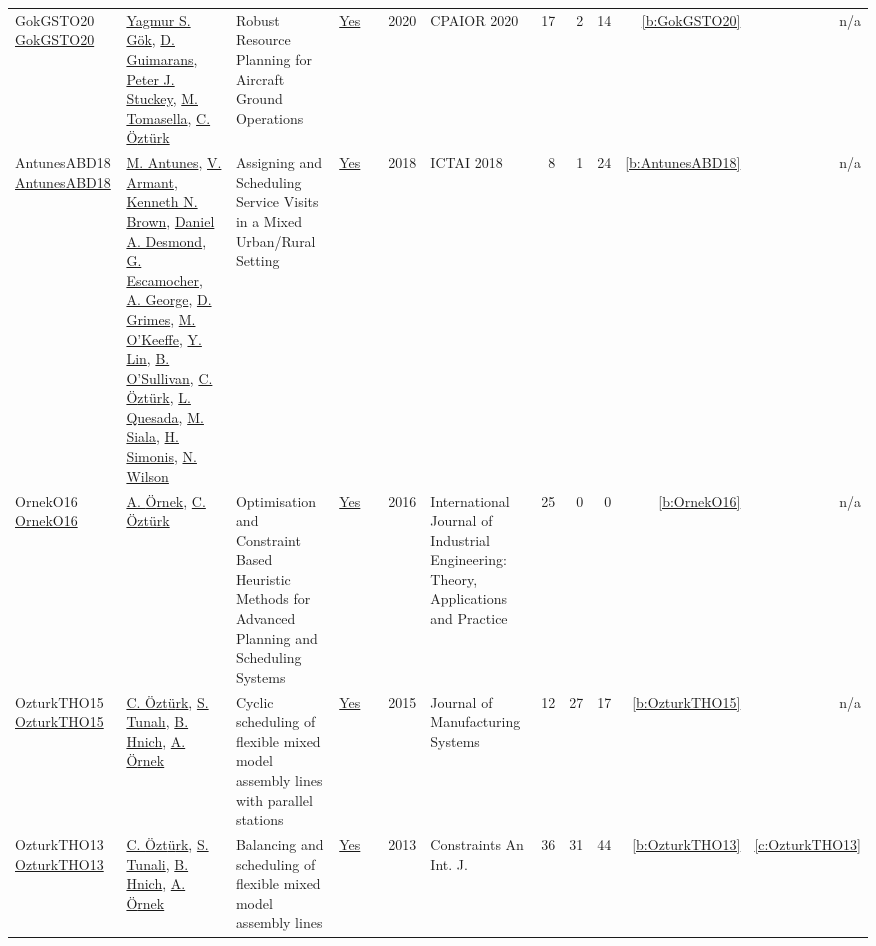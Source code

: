 {\begin{longtable}{>{\raggedright\arraybackslash}p{3cm}>{\raggedright\arraybackslash}p{6cm}>{\raggedright\arraybackslash}p{6.5cm}rrrp{2.5cm}rrrrr}
GokGSTO20 \href{https://doi.org/10.1007/978-3-030-58942-4_15}{GokGSTO20} & \hyperref[auth:a1027]{Yagmur S. G\"{o}k}, \hyperref[auth:a1025]{D. Guimarans}, \hyperref[auth:a126]{Peter J. Stuckey}, \hyperref[auth:a1024]{M. Tomasella}, \hyperref[auth:a136]{C. {\"{O}}zt{\"{u}}rk} & Robust Resource Planning for Aircraft Ground Operations & \href{../works/GokGSTO20.pdf}{Yes} & \cite{GokGSTO20} & 2020 & CPAIOR 2020 & 17 & 2 & 14 & \ref{b:GokGSTO20} & n/a\\
AntunesABD18 \href{https://doi.org/10.1109/ICTAI.2018.00027}{AntunesABD18} & \hyperref[auth:a884]{M. Antunes}, \hyperref[auth:a885]{V. Armant}, \hyperref[auth:a222]{Kenneth N. Brown}, \hyperref[auth:a886]{Daniel A. Desmond}, \hyperref[auth:a887]{G. Escamocher}, \hyperref[auth:a888]{A. George}, \hyperref[auth:a182]{D. Grimes}, \hyperref[auth:a889]{M. O'Keeffe}, \hyperref[auth:a890]{Y. Lin}, \hyperref[auth:a16]{B. O'Sullivan}, \hyperref[auth:a136]{C. {\"{O}}zt{\"{u}}rk}, \hyperref[auth:a891]{L. Quesada}, \hyperref[auth:a130]{M. Siala}, \hyperref[auth:a17]{H. Simonis}, \hyperref[auth:a832]{N. Wilson} & Assigning and Scheduling Service Visits in a Mixed Urban/Rural Setting & \href{../works/AntunesABD18.pdf}{Yes} & \cite{AntunesABD18} & 2018 & ICTAI 2018 & 8 & 1 & 24 & \ref{b:AntunesABD18} & n/a\\
OrnekO16 \href{https://journals.sfu.ca/ijietap/index.php/ijie/article/view/1930}{OrnekO16} & \hyperref[auth:a139]{A. {\"{O}}rnek}, \hyperref[auth:a136]{C. {\"{O}}zt{\"{u}}rk} & Optimisation and Constraint Based Heuristic Methods for Advanced Planning and Scheduling Systems & \href{../works/OrnekO16.pdf}{Yes} & \cite{OrnekO16} & 2016 & International Journal of Industrial Engineering: Theory, Applications and Practice & 25 & 0 & 0 & \ref{b:OrnekO16} & n/a\\
OzturkTHO15 \href{https://www.sciencedirect.com/science/article/pii/S0278612515000527}{OzturkTHO15} & \hyperref[auth:a136]{C. {\"{O}}zt{\"{u}}rk}, \hyperref[auth:a1029]{S. Tunalı}, \hyperref[auth:a138]{B. Hnich}, \hyperref[auth:a139]{A. {\"{O}}rnek} & Cyclic scheduling of flexible mixed model assembly lines with parallel stations & \href{../works/OzturkTHO15.pdf}{Yes} & \cite{OzturkTHO15} & 2015 & Journal of Manufacturing Systems & 12 & 27 & 17 & \ref{b:OzturkTHO15} & n/a\\
OzturkTHO13 \href{https://doi.org/10.1007/s10601-013-9142-6}{OzturkTHO13} & \hyperref[auth:a136]{C. {\"{O}}zt{\"{u}}rk}, \hyperref[auth:a137]{S. Tunali}, \hyperref[auth:a138]{B. Hnich}, \hyperref[auth:a139]{A. {\"{O}}rnek} & Balancing and scheduling of flexible mixed model assembly lines & \href{../works/OzturkTHO13.pdf}{Yes} & \cite{OzturkTHO13} & 2013 & Constraints An Int. J. & 36 & 31 & 44 & \ref{b:OzturkTHO13} & \ref{c:OzturkTHO13}\\

\end{longtable}}

